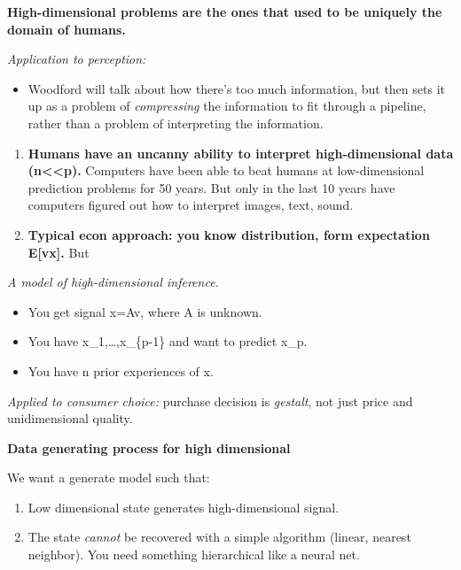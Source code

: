 \documentclass[
  10pt,
  letterpaper,
  DIV=11,
  numbers=noendperiod,
  oneside]{scrartcl}
\providecommand{\tightlist}{%
  \setlength{\itemsep}{0pt}\setlength{\parskip}{0pt}}\usepackage{longtable,booktabs,array}
\begin{document}
\textbf{High-dimensional problems are the ones that used to be uniquely
the domain of humans.}

\emph{Application to perception:}

\begin{itemize}
\tightlist
\item
  Woodford will talk about how there's too much information, but then
  sets it up as a problem of \emph{compressing} the information to fit
  through a pipeline, rather than a problem of interpreting the
  information.
\end{itemize}

\begin{enumerate}
\def\labelenumi{\arabic{enumi}.}
\item
  \textbf{Humans have an uncanny ability to interpret high-dimensional
  data (n\textless\textless p).} Computers have been able to beat humans
  at low-dimensional prediction problems for 50 years. But only in the
  last 10 years have computers figured out how to interpret images,
  text, sound.
\item
  \textbf{Typical econ approach: you know distribution, form expectation
  E{[}v\textbar x{]}.} But
\end{enumerate}

\emph{A model of high-dimensional inference.}

\begin{itemize}
\tightlist
\item
  You get signal x=Av, where A is unknown.
\item
  You have x\_1,\ldots,x\_\{p-1\} and want to predict x\_p.
\item
  You have n prior experiences of x.
\end{itemize}

\emph{Applied to consumer choice:} purchase decision is \emph{gestalt},
not just price and unidimensional quality.

\textbf{Data generating process for high dimensional}

We want a generate model such that:

\begin{enumerate}
\def\labelenumi{\arabic{enumi}.}
\tightlist
\item
  Low dimensional state generates high-dimensional signal.
\item
  The state \emph{cannot} be recovered with a simple algorithm (linear,
  nearest neighbor). You need something hierarchical like a neural net.
\end{enumerate}
\end{document}
